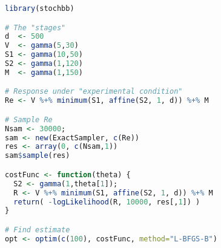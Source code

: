 \begin{lstlisting}[language=R, basicstyle=\footnotesize]
library(stochbb)

# The "stages"
d  <- 500
V  <- gamma(5,30)
S1 <- gamma(10,50)
S2 <- gamma(1,120)
M  <- gamma(1,150) 

# Response under "experimental condition"
Re <- V %+% minimum(S1, affine(S2, 1, d)) %+% M

# Sample Re
Nsam <- 30000;
sam <- new(ExactSampler, c(Re))
res <- array(0, c(Nsam,1))
sam$sample(res)

costFunc <- function(theta) {
  S2 <- gamma(1,theta[1]);
  R <- V %+% minimum(S1, affine(S2, 1, d)) %+% M
  return( -logLikelihood(R, 10000, res[,1]) )
}

# Find estimate
opt <- optim(c(100), costFunc, method="L-BFGS-B")
\end{lstlisting}